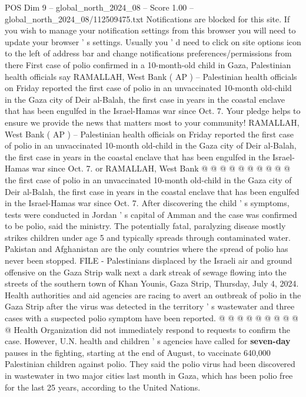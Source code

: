 \begin{textsample}{POS Dim 9 – global\_north\_2024\_08 – Score 1.00 – global\_north\_2024\_08/112509475.txt}  \label{ex:f9_pos_198}
Notifications are blocked for this site.
If you wish to manage your notification settings from this browser you will need to update your browser ' s settings.
Usually you ' d need to click on site options icon to the left of address bar and change notifications preferences/permissions from there First case of polio confirmed in a 10-month-old child in Gaza, Palestinian health officials say RAMALLAH, West Bank ( AP ) -- Palestinian health officials on Friday reported the first case of polio in an unvaccinated 10-month old-child in the Gaza city of Deir al-Balah, the first case in years in the coastal enclave that has been engulfed in the Israel-Hamas war since Oct. 7.
Your pledge helps to ensure we provide the news that matters most to your community!
RAMALLAH, West Bank ( AP ) -- Palestinian health officials on Friday reported the first case of polio in an unvaccinated 10-month old-child in the Gaza city of Deir al-Balah, the first case in years in the coastal enclave that has been engulfed in the Israel-Hamas war since Oct. 7. or RAMALLAH, West Bank @ @ @ @ @ @ @ @ @ @ the first case of polio in an unvaccinated 10-month old-child in the Gaza city of Deir al-Balah, the first case in years in the coastal enclave that has been engulfed in the Israel-Hamas war since Oct. 7.
After discovering the child ' s symptoms, tests were conducted in Jordan ' s capital of Amman and the case was confirmed to be polio, said the ministry.
The potentially fatal, paralyzing disease mostly strikes children under age 5 and typically spreads through contaminated water.
Pakistan and Afghanistan are the only countries where the spread of polio has never been stopped.
FILE - Palestinians displaced by the Israeli air and ground offensive on the Gaza Strip walk next a dark streak of sewage flowing into the streets of the southern town of Khan Younis, Gaza Strip, Thursday, July 4, 2024.
Health authorities and aid agencies are racing to avert an outbreak of polio in the Gaza Strip after the virus was detected in the territory ' s wastewater and three cases with a suspected polio symptom have been reported. @ @ @ @ @ @ @ @ @ @ Health Organization did not immediately respond to requests to confirm the case.
However, U.N. health and children ' s agencies have called for \textbf{seven-day} pauses in the fighting, starting at the end of August, to vaccinate 640,000 Palestinian children against polio.
They said the polio virus had been discovered in wastewater in two major cities last month in Gaza, which has been polio free for the last 25 years, according to the United Nations.

\end{textsample}
